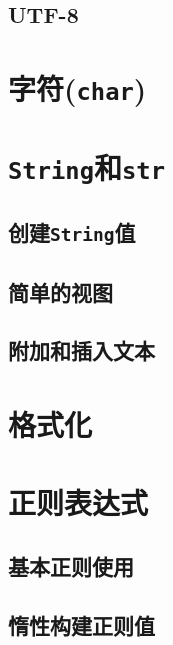 \subsection{UTF-8}\label{utf8}

\section{字符(\texttt{char})}

\section{\texttt{String}和\texttt{str}}

\subsection{创建\texttt{String}值}

\subsection{简单的视图}

\subsection{附加和插入文本}\label{AppendText}

\section{格式化}\label{format}

\section{正则表达式}

\subsection{基本正则使用}

\subsection{惰性构建正则值}\label{LazyRegex}
